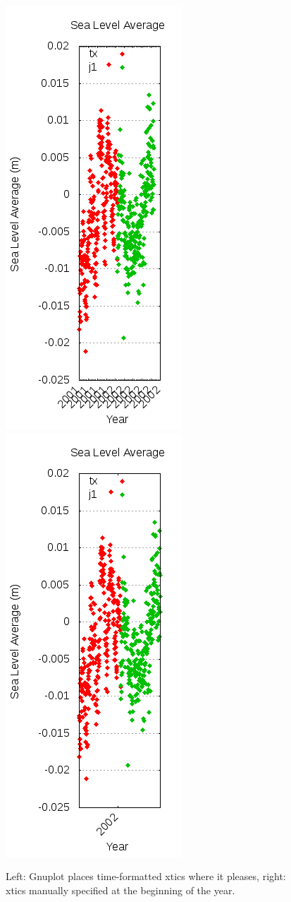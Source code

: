 \documentclass{article}
\begin{document}
\begin{figure}
\includegraphics{files/blog/2018_06_02_measuring_sea_level_averages_using_rads/2018_06_02_timefmt_before.png}
\includegraphics{files/blog/2018_06_02_measuring_sea_level_averages_using_rads/2018_06_02_timefmt_after.png}
\caption{Left: Gnuplot places time-formatted xtics where it pleases, right: xtics manually specified at the beginning of the year.}
\end{figure}
\end{document}

